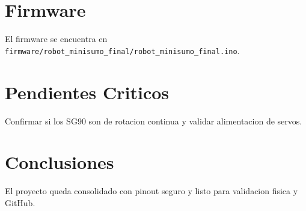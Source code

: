 \documentclass[12pt,a4paper]{article}
\begin{document}
\section{Firmware}
El firmware se encuentra en \texttt{firmware/robot\_minisumo\_final/robot\_minisumo\_final.ino}.
\section{Pendientes Criticos}
Confirmar si los SG90 son de rotacion continua y validar alimentacion de servos.
\section{Conclusiones}
El proyecto queda consolidado con pinout seguro y listo para validacion fisica y GitHub.
\end{document}
